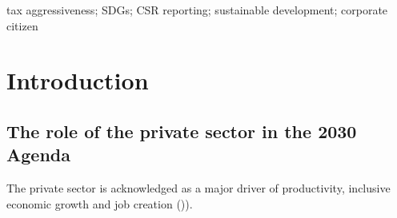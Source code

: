 \documentclass[preprint,12pt,authoryear]{elsarticle}
\begin{document}
\begin{frontmatter}
\begin{keyword}
tax aggressiveness; SDGs; CSR reporting; sustainable development; corporate citizen



\end{keyword}

\end{frontmatter}


\section{Introduction}
\subsection{The role of the private sector in the 2030 Agenda}
The private sector is acknowledged as a major driver of productivity, inclusive economic growth and job creation ()\cite{UnitedNationsGeneralAssembly2015b}). 










\cite{Whait2018}






 
\end{document}
